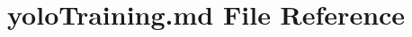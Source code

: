 \hypertarget{yoloTraining_8md}{}\section{yolo\+Training.\+md File Reference}
\label{yoloTraining_8md}
